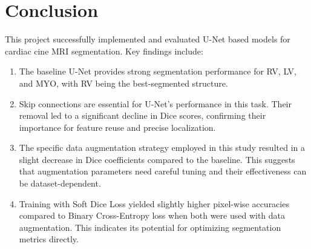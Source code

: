 \documentclass{article}
\begin{document}
\section{Conclusion}
This project successfully implemented and evaluated U-Net based models for cardiac cine MRI segmentation. Key findings include:
\begin{enumerate}
  \item The baseline U-Net provides strong segmentation performance for RV, LV, and MYO, with RV being the best-segmented structure.
  \item Skip connections are essential for U-Net's performance in this task. Their removal led to a significant decline in Dice scores, 
  confirming their importance for feature reuse and precise localization.
  \item The specific data augmentation strategy employed in this study resulted in a slight decrease in Dice coefficients compared to 
  the baseline. This suggests that augmentation parameters need careful tuning and their effectiveness can be dataset-dependent.
  \item Training with Soft Dice Loss yielded slightly higher pixel-wise accuracies compared to Binary Cross-Entropy loss when both 
  were used with data augmentation. This indicates its potential for optimizing segmentation metrics directly.
\end{enumerate}







\end{document}
